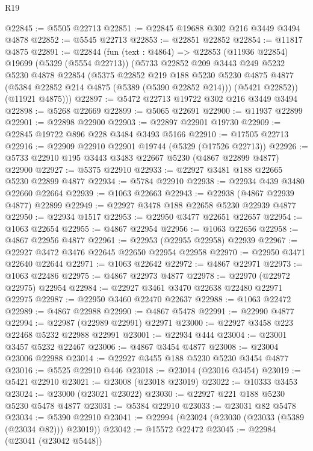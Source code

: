 \begin{lexlean}{R19}
\begin{coremodule}
@22845 := @5505 @22713
@22851 := @22845 @19688 @302 @216 @3449 @3494 @4878
@22852 := @5545 @22713
@22853 := @22851 @22852
@22854 := @11817 @4875
@22891 := @22844
    (fun (text : @4864) =>
    @22853
      (@11936 @22854)
      @19699
      (@5329 (@5554 @22713))
      (@5733
        @22852
        @209
        @3443
        @249
        @5232
        @5230
        @4878
        @22854
        (@5375
          @22852
          @219
          @188
          @5230
          @5230
          @4875
          @4877
          (@5384 @22852 @214 @4875 (@5389 (@5390 @22852 @214)))
          (@5421 @22852))
        (@11921 @4875)))
@22897 := @5472 @22713 @19722 @302 @216 @3449 @3494
@22898 := @5268 @22669
@22899 := @5065 @22691
@22900 := @11937 @22899
@22901 := @22898 @22900
@22903 := @22897 @22901 @19730
@22909 := @22845 @19722 @896 @228 @3484 @3493 @5166
@22910 := @17505 @22713
@22916 := @22909 @22910 @22901 @19744 (@5329 (@17526 @22713))
@22926 := @5733 @22910 @195 @3443 @3483 @22667 @5230 (@4867 @22899 @4877) @22900
@22927 := @5375 @22910
@22933 := @22927 @3481 @188 @22665 @5230 @22899 @4877
@22934 := @5784 @22910
@22938 := @22934 @439 @3480 @22660 @22664
@22939 := @1063 @22663
@22943 := @22938 (@4867 @22939 @4877) @22899
@22949 := @22927 @3478 @188 @22658 @5230 @22939 @4877
@22950 := @22934 @1517
@22953 := @22950 @3477 @22651 @22657
@22954 := @1063 @22654
@22955 := @4867 @22954
@22956 := @1063 @22656
@22958 := @4867 @22956 @4877
@22961 := @22953 (@22955 @22958) @22939
@22967 := @22927 @3472 @3476 @22645 @22650 @22954 @22958
@22970 := @22950 @3471 @22640 @22644
@22971 := @1063 @22642
@22972 := @4867 @22971
@22973 := @1063 @22486
@22975 := @4867 @22973 @4877
@22978 := @22970 (@22972 @22975) @22954
@22984 := @22927 @3461 @3470 @22638 @22480 @22971 @22975
@22987 := @22950 @3460 @22470 @22637
@22988 := @1063 @22472
@22989 := @4867 @22988
@22990 := @4867 @5478
@22991 := @22990 @4877
@22994 := @22987 (@22989 @22991) @22971
@23000 := @22927 @3458 @223 @22468 @5232 @22988 @22991
@23001 := @22934 @444
@23004 := @23001 @3457 @5232 @22467
@23006 := @4867 @3454 @4877
@23008 := @23004 @23006 @22988
@23014 := @22927 @3455 @188 @5230 @5230 @3454 @4877
@23016 := @5525 @22910 @446
@23018 := @23014 (@23016 @3454)
@23019 := @5421 @22910
@23021 := @23008 (@23018 @23019)
@23022 := @10333 @3453
@23024 := @23000 (@23021 @23022)
@23030 := @22927 @221 @188 @5230 @5230 @5478 @4877
@23031 := @5384 @22910
@23033 := @23031 @82 @5478
@23034 := @5390 @22910
@23041 := @22994 (@23024 (@23030 (@23033 (@5389 (@23034 @82))) @23019))
@23042 := @15572 @22472
@23045 := @22984 (@23041 (@23042 @5448))

\end{coremodule}
\end{lexlean}
